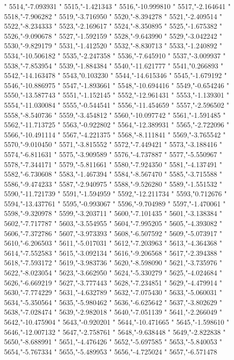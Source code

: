 "
5514,"-7.093931
"
5515,"-1.421343
"
5516,"-10.999810
"
5517,"-2.164641
"
5518,"-7.906282
"
5519,"-3.716950
"
5520,"-8.394278
"
5521,"-2.409514
"
5522,"-8.234333
"
5523,"-2.169617
"
5524,"-8.350895
"
5525,"-1.675382
"
5526,"-9.090678
"
5527,"-1.592159
"
5528,"-9.643990
"
5529,"-3.042242
"
5530,"-9.829179
"
5531,"-1.412520
"
5532,"-8.830713
"
5533,"-1.240892
"
5534,"-10.506182
"
5535,"-2.247358
"
5536,"-7.645910
"
5537,"-3.009937
"
5538,"-7.853954
"
5539,"-1.884384
"
5540,"-11.621777
"
5541,"0.266893
"
5542,"-14.163478
"
5543,"0.103230
"
5544,"-14.615346
"
5545,"-1.679192
"
5546,"-10.886975
"
5547,"-1.893661
"
5548,"-10.694416
"
5549,"-0.654246
"
5550,"-13.587743
"
5551,"-1.152145
"
5552,"-12.961431
"
5553,"-1.139301
"
5554,"-11.030084
"
5555,"-0.544541
"
5556,"-11.454659
"
5557,"-2.596502
"
5558,"-8.540736
"
5559,"-3.454812
"
5560,"-10.097742
"
5561,"-1.591485
"
5562,"-11.713725
"
5563,"-0.922802
"
5564,"-12.389931
"
5565,"-2.722096
"
5566,"-10.491114
"
5567,"-4.221375
"
5568,"-8.111841
"
5569,"-3.765542
"
5570,"-9.010450
"
5571,"-3.815552
"
5572,"-7.449421
"
5573,"-3.188416
"
5574,"-6.811631
"
5575,"-3.909589
"
5576,"-4.737887
"
5577,"-5.550967
"
5578,"-7.344171
"
5579,"-5.811661
"
5580,"-7.924350
"
5581,"-4.137491
"
5582,"-6.730608
"
5583,"-1.467394
"
5584,"-8.567470
"
5585,"-3.715588
"
5586,"-9.474233
"
5587,"-2.940975
"
5588,"-9.526280
"
5589,"-1.551532
"
5590,"-11.721739
"
5591,"-1.594959
"
5592,"-12.211734
"
5593,"0.712676
"
5594,"-13.437761
"
5595,"-0.993067
"
5596,"-9.704989
"
5597,"-1.470061
"
5598,"-9.320978
"
5599,"-3.203711
"
5600,"-7.101435
"
5601,"-3.138384
"
5602,"-7.717787
"
5603,"-3.554955
"
5604,"-7.995205
"
5605,"-4.393082
"
5606,"-7.372786
"
5607,"-3.973393
"
5608,"-6.507592
"
5609,"-5.073917
"
5610,"-6.206503
"
5611,"-5.017031
"
5612,"-7.203963
"
5613,"-4.364368
"
5614,"-7.552583
"
5615,"-3.092134
"
5616,"-9.206568
"
5617,"-2.394388
"
5618,"-7.593172
"
5619,"-3.983736
"
5620,"-8.598090
"
5621,"-3.735976
"
5622,"-8.023054
"
5623,"-3.662950
"
5624,"-5.330279
"
5625,"-4.024684
"
5626,"-6.669219
"
5627,"-3.777443
"
5628,"-7.234851
"
5629,"-4.479914
"
5630,"-7.774229
"
5631,"-4.632789
"
5632,"-7.075430
"
5633,"-5.060031
"
5634,"-5.350564
"
5635,"-5.980462
"
5636,"-6.625642
"
5637,"-3.802629
"
5638,"-7.028474
"
5639,"-2.982018
"
5640,"-7.051139
"
5641,"-2.266049
"
5642,"-10.475904
"
5643,"-0.920201
"
5644,"-10.471665
"
5645,"-1.598610
"
5646,"-12.007132
"
5647,"-2.758761
"
5648,"-9.638448
"
5649,"-2.822838
"
5650,"-8.688991
"
5651,"-4.476426
"
5652,"-5.697585
"
5653,"-5.840053
"
5654,"-5.767334
"
5655,"-5.489953
"
5656,"-4.725024
"
5657,"-6.571478
